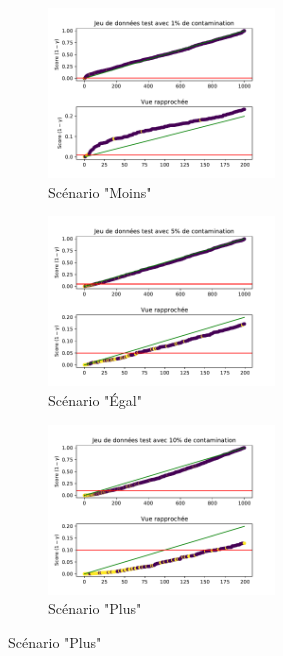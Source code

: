 \begin{figure}[htb]
	\centering
	\begin{subfigure}{6cm}
		\DIFdelbeginFL %
\DIFdelendFL \includegraphics[width=6cm]{images/images_davae/pvalues_scenario_cars_moins}
		\caption{Scénario "Moins"}
	\end{subfigure}
	\begin{subfigure}{6cm}
		\DIFdelbeginFL %
\DIFdelendFL \includegraphics[width=6cm]{images/images_davae/pvalues_scenario_cars_egal}
		\caption{Scénario "Égal"}
	\end{subfigure}
	\begin{subfigure}{6cm}
		\DIFdelbeginFL %
\DIFdelendFL \includegraphics[width=6cm]{images/images_davae/pvalues_scenario_cars_plus}
		\caption{Scénario "Plus"}
	\end{subfigure}
\DIFdelbeginFL %
\DIFdelendFL \DIFaddbeginFL 


\end{figure}
